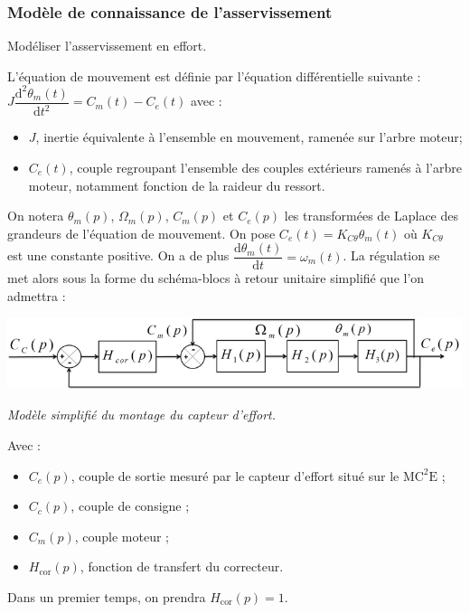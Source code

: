 \documentclass[10pt,fleqn]{article} %
\begin{document}
\subsubsection*{Modèle de connaissance de l'asservissement}

\begin{obj}
Modéliser l’asservissement en effort.
\end{obj}

L’équation de mouvement est définie par l’équation différentielle suivante : 
$J\dfrac{\text{d}^2\theta_m(t)}{\text{d}t^2}=C_m(t)-C_e(t)$  avec :
\begin{itemize}
\item $J$, inertie équivalente à l’ensemble en mouvement, ramenée sur l’arbre moteur;
\item $C_e(t)$, couple regroupant l’ensemble des couples extérieurs ramenés à l’arbre moteur, notamment fonction de la raideur du ressort.
\end{itemize}


On notera $\theta_m(p)$, $\Omega_m(p)$, $C_m(p)$ et $C_e(p)$ les transformées de Laplace des grandeurs de l’équation de mouvement.
On pose $C_e(t)=K_{C\theta}\theta_m(t)$ où  $K_{C\theta}$ est une constante positive. On a de plus $\dfrac{\text{d}\theta_m(t)}{\text{d}t}=\omega_m(t)$. La régulation se met alors sous la forme du schéma-blocs à retour unitaire simplifié que l’on
admettra :

\begin{center}
\includegraphics[width=.8\linewidth]{images/Sujet/images/fig_06}

\textit{Modèle simplifié du montage du capteur d’effort.}
\end{center}

Avec :
\begin{itemize}
\item $C_e(p)$, couple de sortie mesuré par le capteur d’effort situé sur le $\text{MC}^2\text{E}$ ;
\item $C_c(p)$, couple de consigne ;
\item $C_m(p)$, couple moteur ;
\item $H_{\text{cor}}(p)$, fonction de transfert du correcteur.
\end{itemize}
Dans un premier temps, on prendra $H_{\text{cor}}(p)=1$.
\end{document}
